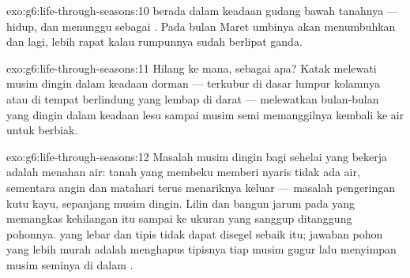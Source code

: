 \begin{solution}{exo:g6:life-through-seasons:10}
 berada dalam keadaan gudang bawah tanahnya --- hidup, dan
menunggu sebagai . Pada bulan Maret umbinya akan
menumbuhkan  dan  lagi, lebih rapat kalau rumpunnya sudah
berlipat ganda.
\end{solution}

\begin{solution}{exo:g6:life-through-seasons:11}
Hilang ke mana, sebagai apa? Katak melewati musim dingin dalam keadaan
dorman --- terkubur di dasar lumpur kolamnya atau di tempat berlindung
yang lembap di darat --- melewatkan bulan-bulan yang dingin dalam
keadaan lesu sampai musim semi memanggilnya kembali ke air untuk
berbiak.
\end{solution}

\begin{solution}{exo:g6:life-through-seasons:12}
Masalah musim dingin bagi sehelai  yang bekerja adalah menahan air:
tanah yang membeku memberi  nyaris tidak ada air, sementara
angin dan matahari terus menariknya keluar --- masalah pengeringan
kutu kayu, sepanjang musim dingin. Lilin dan bangun jarum pada 
yang  memangkas kehilangan itu sampai ke ukuran yang
sanggup ditanggung pohonnya.  yang lebar dan tipis tidak dapat
disegel sebaik itu; jawaban pohon  yang lebih murah adalah
menghapus  tipisnya tiap musim gugur lalu menyimpan musim seminya
di dalam .
\end{solution}

